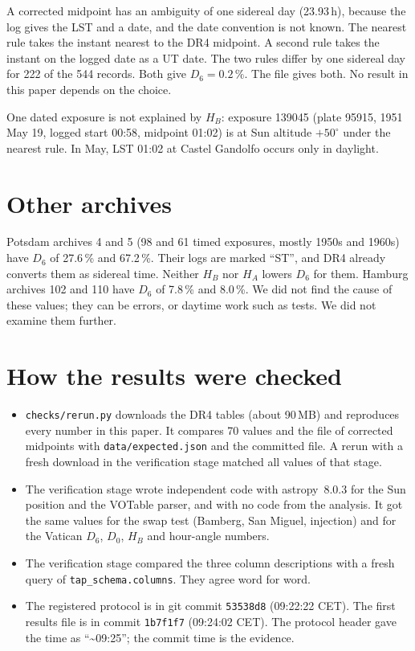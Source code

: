 \documentclass[11pt]{article}
\begin{document}
A corrected midpoint has an ambiguity of one sidereal day (23.93\,h), because the log gives the LST and a date, and the date convention is not known. The nearest rule takes the instant nearest to the DR4 midpoint. A second rule takes the instant on the logged date as a UT date. The two rules differ by one sidereal day for 222 of the 544 records. Both give $D_6=0.2\,\%$. The file gives both. No result in this paper depends on the choice.

One dated exposure is not explained by $H_B$: exposure 139045 (plate 95915, 1951 May 19, logged start 00:58, midpoint 01:02) is at Sun altitude $+50^\circ$ under the nearest rule. In May, LST 01:02 at Castel Gandolfo occurs only in daylight.

\section{Other archives}
Potsdam archives 4 and 5 (98 and 61 timed exposures, mostly 1950s and 1960s) have $D_6$ of 27.6\,\% and 67.2\,\%. Their logs are marked ``ST'', and DR4 already converts them as sidereal time. Neither $H_B$ nor $H_A$ lowers $D_6$ for them. Hamburg archives 102 and 110 have $D_6$ of 7.8\,\% and 8.0\,\%. We did not find the cause of these values; they can be errors, or daytime work such as tests. We did not examine them further.

\section{How the results were checked}
\begin{itemize}
\item \texttt{checks/rerun.py} downloads the DR4 tables (about 90\,MB) and reproduces every number in this paper. It compares 70 values and the file of corrected midpoints with \texttt{data/expected.json} and the committed file. A rerun with a fresh download in the verification stage matched all values of that stage.
\item The verification stage wrote independent code with astropy~8.0.3 for the Sun position and the VOTable parser, and with no code from the analysis. It got the same values for the swap test (Bamberg, San Miguel, injection) and for the Vatican $D_6$, $D_0$, $H_B$ and hour-angle numbers.
\item The verification stage compared the three column descriptions with a fresh query of \texttt{tap\_schema.columns}. They agree word for word.
\item The registered protocol is in git commit \texttt{53538d8} (09:22:22 CET). The first results file is in commit \texttt{1b7f1f7} (09:24:02 CET). The protocol header gave the time as ``\textasciitilde09:25''; the commit time is the evidence.
\end{itemize}
\end{document}
